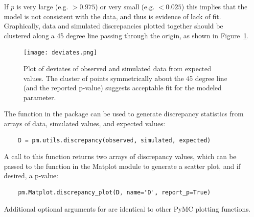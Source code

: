If $p$ is very large (e.g. $>0.975$) or very small (e.g. $<0.025$) this implies that the model is not consistent with the data, and thus is evidence of lack of fit. Graphically, data and simulated discrepancies plotted together should be clustered along a 45 degree line passing through the origin, as shown in Figure~\ref{fig:deviate}.

\begin{figure}[h]
        \begin{center}
        \texttt{[image: deviates.png]}
    \end{center}
    \caption{Plot of deviates of observed and simulated data from expected values. The cluster of points symmetrically about the 45 degree line (and the reported p-value) suggests acceptable fit for the modeled parameter.}
    \label{fig:deviate}
\end{figure}

The  function in the  package can be used to generate discrepancy statistics from arrays of data, simulated values, and expected values:

\begin{verbatim}
	D = pm.utils.discrepancy(observed, simulated, expected)
\end{verbatim}

A call to this function returns two arrays of discrepancy values, which can be passed to the  function in the Matplot module to generate a scatter plot, and if desired, a p-value:

\begin{verbatim}
	pm.Matplot.discrepancy_plot(D, name='D', report_p=True)
\end{verbatim}

Additional optional arguments for  are identical to other PyMC plotting functions.

